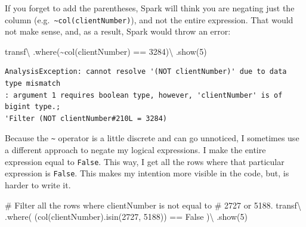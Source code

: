 \documentclass[
  11pt,
  letterpaper,
  DIV=11,
  numbers=noendperiod]{scrreprt}
\newenvironment{Shaded}{\begin{snugshade}}{\end{snugshade}}
\newcommand{\CommentTok}[1]{\textcolor[rgb]{0.37,0.37,0.37}{#1}}
\newcommand{\DecValTok}[1]{\textcolor[rgb]{0.68,0.00,0.00}{#1}}
\newcommand{\NormalTok}[1]{\textcolor[rgb]{0.00,0.23,0.31}{#1}}
\newcommand{\OperatorTok}[1]{\textcolor[rgb]{0.37,0.37,0.37}{#1}}
\newcommand{\StringTok}[1]{\textcolor[rgb]{0.13,0.47,0.30}{#1}}
\newcommand{\VariableTok}[1]{\textcolor[rgb]{0.07,0.07,0.07}{#1}}
\begin{document}
If you forget to add the parentheses, Spark will think you are negating
just the column
(e.g.~\texttt{\textasciitilde{}col(\textquotesingle{}clientNumber\textquotesingle{})}),
and not the entire expression. That would not make sense, and, as a
result, Spark would throw an error:

\begin{Shaded}
\begin{Highlighting}[]
\NormalTok{transf}\OperatorTok{\textbackslash{}}
\NormalTok{  .where(}\OperatorTok{\textasciitilde{}}\NormalTok{col(}\StringTok{\textquotesingle{}clientNumber\textquotesingle{}}\NormalTok{) }\OperatorTok{==} \DecValTok{3284}\NormalTok{)}\OperatorTok{\textbackslash{}}
\NormalTok{  .show(}\DecValTok{5}\NormalTok{)}
\end{Highlighting}
\end{Shaded}

\begin{verbatim}
AnalysisException: cannot resolve '(NOT clientNumber)' due to data type mismatch
: argument 1 requires boolean type, however, 'clientNumber' is of bigint type.;
'Filter (NOT clientNumber#210L = 3284)
\end{verbatim}

Because the \texttt{\textasciitilde{}} operator is a little discrete and
can go unnoticed, I sometimes use a different approach to negate my
logical expressions. I make the entire expression equal to
\texttt{False}. This way, I get all the rows where that particular
expression is \texttt{False}. This makes my intention more visible in
the code, but, is harder to write it.

\begin{Shaded}
\begin{Highlighting}[]
\CommentTok{\# Filter all the rows where \textasciigrave{}clientNumber\textasciigrave{} is not equal to}
\CommentTok{\# 2727 or 5188.}
\NormalTok{transf}\OperatorTok{\textbackslash{}}
\NormalTok{  .where( (col(}\StringTok{\textquotesingle{}clientNumber\textquotesingle{}}\NormalTok{).isin(}\DecValTok{2727}\NormalTok{, }\DecValTok{5188}\NormalTok{)) }\OperatorTok{==} \VariableTok{False}\NormalTok{ )}\OperatorTok{\textbackslash{}}
\NormalTok{  .show(}\DecValTok{5}\NormalTok{)}
\end{Highlighting}
\end{Shaded}
\end{document}
